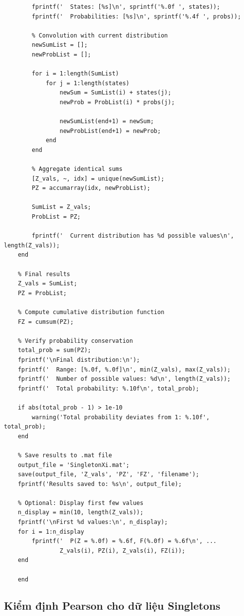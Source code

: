\begin{matlab}
\begin{lstlisting}
        fprintf('  States: [%s]\n', sprintf('%.0f ', states));
        fprintf('  Probabilities: [%s]\n', sprintf('%.4f ', probs));
        
        % Convolution with current distribution
        newSumList = [];
        newProbList = [];
        
        for i = 1:length(SumList)
            for j = 1:length(states)
                newSum = SumList(i) + states(j);
                newProb = ProbList(i) * probs(j);
                
                newSumList(end+1) = newSum;
                newProbList(end+1) = newProb;
            end
        end
        
        % Aggregate identical sums
        [Z_vals, ~, idx] = unique(newSumList);
        PZ = accumarray(idx, newProbList);
        
        SumList = Z_vals;
        ProbList = PZ;
        
        fprintf('  Current distribution has %d possible values\n', length(Z_vals));
    end

    % Final results
    Z_vals = SumList;
    PZ = ProbList;
    
    % Compute cumulative distribution function
    FZ = cumsum(PZ);

    % Verify probability conservation
    total_prob = sum(PZ);
    fprintf('\nFinal distribution:\n');
    fprintf('  Range: [%.0f, %.0f]\n', min(Z_vals), max(Z_vals));
    fprintf('  Number of possible values: %d\n', length(Z_vals));
    fprintf('  Total probability: %.10f\n', total_prob);
    
    if abs(total_prob - 1) > 1e-10
        warning('Total probability deviates from 1: %.10f', total_prob);
    end

    % Save results to .mat file
    output_file = 'SingletonXi.mat';
    save(output_file, 'Z_vals', 'PZ', 'FZ', 'filename');
    fprintf('Results saved to: %s\n', output_file);
    
    % Optional: Display first few values
    n_display = min(10, length(Z_vals));
    fprintf('\nFirst %d values:\n', n_display);
    for i = 1:n_display
        fprintf('  P(Z = %.0f) = %.6f, F(%.0f) = %.6f\n', ...
                Z_vals(i), PZ(i), Z_vals(i), FZ(i));
    end
    
    end
    \end{lstlisting}
\end{matlab}

\subsection{Kiểm định Pearson cho dữ liệu Singletons}

